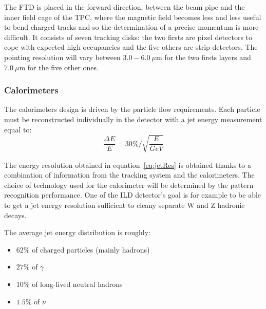      The FTD is placed in the forward direction, between the beam pipe and the inner field cage of the TPC, where the magnetic field becomes less and less useful to bend charged tracks and so the determination of a precise momentum is more difficult.
     It consists of seven tracking disks: the two firsts are pixel detectors to cope with expected high occupancies and the five others are strip detectors.
     The pointing resolution will vary between $3.0-6.0 \ \mu$m for the two firsts layers and $7.0 \ \mu$m for the five other ones.
     


      \subsubsection{Calorimeters}

      The calorimeters design is driven by the particle flow requirements.
      Each particle must be reconstructed individually in the detector with a jet energy measurement equal to:
      \begin{equation}
        \frac{\Delta E}{E} = 30 \% / \sqrt{\frac{E}{GeV}}
        \label{eq:jetRes}
      \end{equation}

      The energy resolution obtained in equation~\ref{eq:jetRes} is obtained thanks to a combination of information from the tracking system and the calorimeters. 
      The choice of technology used for the calorimeter will be determined by the pattern recognition performance. 
      One of the ILD detector's goal is for example to be able to get a jet energy resolution sufficient to cleany separate W and Z hadronic decays.
      
      The average jet energy distribution is roughly: 
      \begin{itemize}
        \item $62 \%$ of charged particles (mainly hadrons)
        \item $27 \%$ of $\gamma$
        \item $10 \%$ of long-lived neutral hadrons
        \item $1.5 \%$ of $\nu$
      \end{itemize}

